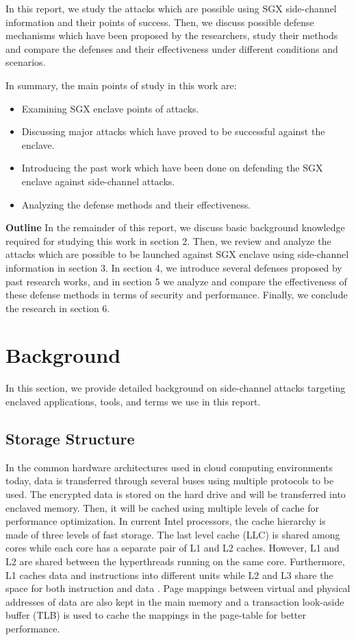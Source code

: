In this report, we study the attacks which are possible using SGX side-channel information and their points of success. Then, we discuss possible defense mechanisms which have been proposed by the researchers, study their methods and compare the defenses and their effectiveness under different conditions and scenarios.

In summary, the main points of study in this work are:
\begin{itemize}
	\item Examining SGX enclave points of attacks.
	\item Discussing major attacks which have proved to be successful against the enclave.
	\item Introducing the past work which have been done on defending the SGX enclave against side-channel attacks.
	\item Analyzing the defense methods and their effectiveness.
\end{itemize} 
\textbf{Outline} In the remainder of this report, we discuss basic background knowledge required for studying this work in section 2. Then, we review and analyze the attacks which are possible to be launched against SGX enclave using side-channel information in section 3. In section 4, we introduce several defenses proposed by past research works, and in section 5 we analyze and compare the effectiveness of these defense methods in terms of security and performance. Finally, we conclude the research in section 6.
\section{Background}
In this section, we provide detailed background on side-channel attacks targeting enclaved applications, tools, and terms we use in this report.

\subsection{Storage Structure}

In the common hardware architectures used in cloud computing environments today, data is transferred through several buses using multiple protocols to be used. The encrypted data is stored on the hard drive and will be transferred into enclaved memory. Then, it will be cached using multiple levels of cache for performance optimization. In current Intel processors, the cache hierarchy is made of three levels of fast storage. The last level cache (LLC) is shared among cores while each core has a separate pair of L1 and L2 caches. However, L1 and L2 are shared between the hyperthreads running on the same core. Furthermore, L1 caches data and instructions into different units while L2 and L3 share the space for both instruction and data \cite{brasser2017software}. Page mappings between virtual and physical addresses of data are also kept in the main memory and a transaction look-aside buffer (TLB) is used to cache the mappings in the page-table for better performance.


